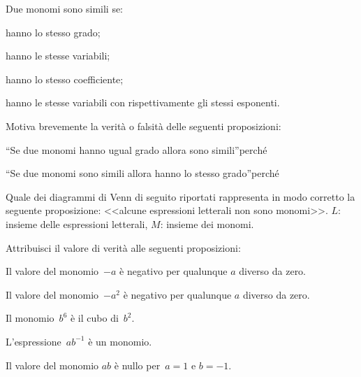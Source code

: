 \begin{esercizio}[\Ast]
 \label{ese:10.8} %
Due monomi sono simili se:

\begin{enumeratea}
 \item hanno lo stesso grado;
 \item hanno le stesse variabili;
 \item hanno lo stesso coefficiente;
 \item hanno le stesse variabili con rispettivamente gli stessi esponenti.
\end{enumeratea}
\end{esercizio}
\pagebreak
\begin{esercizio}
 \label{ese:10.9} %
Motiva brevemente la verità o falsità delle seguenti proposizioni:
\TabPositions{8.5cm}
\begin{enumeratea}
 \item ``Se due monomi hanno ugual grado allora sono simili''\tab\boxV\quad\boxF\qquad perché\dotfill
 \item ``Se due monomi sono simili allora hanno lo stesso grado''\tab\boxV\quad\boxF\qquad perché\dotfill
\end{enumeratea}
\end{esercizio}

\begin{esercizio}
 \label{ese:10.10} %
Quale dei diagrammi di Venn di seguito riportati rappresenta in modo corretto la seguente proposizione: <<alcune espressioni letterali non sono monomi>>.
$L$: insieme delle espressioni letterali, $M$: insieme dei monomi.
\begin{center}

\end{center}
\end{esercizio}

\begin{esercizio}[\Ast]
 \label{ese:10.11} %
 Attribuisci il valore di verità alle seguenti proposizioni:
\TabPositions{11.5cm}
\begin{enumeratea}
\item Il valore del monomio~$-a$ è negativo per qualunque $a$ diverso da zero.\tab\boxV\quad\boxF
\item Il valore del monomio~$-a^{2}$ è negativo per qualunque $a$ diverso da zero.\tab\boxV\quad\boxF
\item Il monomio~$b^{6}$ è il cubo di~$b^{2}$.\tab\boxV\quad\boxF
\item L'espressione~$ab^{-1}$ è un monomio.\tab\boxV\quad\boxF
\item Il valore del monomio $ab$ è nullo per~$a = 1$ e $b =-1$.\tab\boxV\quad\boxF
\end{enumeratea}
\end{esercizio}



